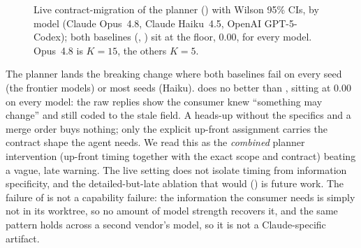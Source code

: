 \begin{figure}[t]
\centering
{}
\caption{Live contract-migration \ctsr{} of the planner () with Wilson 95\% CIs, by
model (Claude Opus~4.8, Claude Haiku~4.5, OpenAI GPT-5-Codex); both baselines (,
) sit at the floor, $0.00$, for every model. Opus~4.8 is $K{=}15$, the others
$K{=}5$.}
\label{fig:live}
\end{figure}

The planner lands the breaking change where both baselines fail on
every seed (the frontier models) or most seeds (Haiku).  does no better than ,
sitting at 0.00 on every model: the raw replies show the consumer knew ``something may change'' and still coded
to the stale field. A heads-up without the specifics and a merge order buys nothing; only the
explicit up-front assignment carries the contract shape the agent needs. We read this as the
\emph{combined} planner intervention (up-front timing together with the exact scope and
contract) beating a vague, late warning. The live setting does not isolate timing from information
specificity, and the detailed-but-late ablation that would () is future work. The failure of  is not a capability failure:
the information the consumer needs is simply not in its worktree, so no amount of model strength
recovers it, and the same pattern holds across a second vendor's model, so it is not a
Claude-specific artifact.

